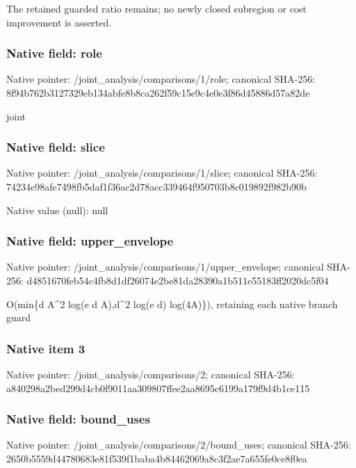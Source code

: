 \documentclass[10pt,a4paper]{article}
\begin{document}
\begingroup\raggedright\sloppy The retained guarded ratio remains;\allowbreak{} no newly closed subregion or cost improvement is asserted.\par\endgroup

\subsubsection{Native field: role}
Native pointer: /joint\_\allowbreak{}analysis/comparisons/1/role; canonical SHA-256: 8f94b762b3127329eb134abfe8b8ca262f59c15e9c4e0e3f86d45886d57a82de

\begingroup\raggedright\sloppy joint\par\endgroup

\subsubsection{Native field: slice}
Native pointer: /joint\_\allowbreak{}analysis/comparisons/1/slice; canonical SHA-256: 74234e98afe7498fb5daf1f36ac2d78acc339464f950703b8c019892f982b90b

Native value (null): null

\subsubsection{Native field: upper\_\allowbreak{}envelope}
Native pointer: /joint\_\allowbreak{}analysis/comparisons/1/upper\_\allowbreak{}envelope; canonical SHA-256: d4851670feb54c4fb8d1df26074e2be81da28390a1b511e55183ff2020dc5f04

\begingroup\raggedright\sloppy O(min\{d A\textasciicircum{}2 log(e d A),\allowbreak{}d\textasciicircum{}2 log(e d) log(4A)\}),\allowbreak{} retaining each native branch guard\par\endgroup

\subsubsection{Native item 3}
Native pointer: /joint\_\allowbreak{}analysis/comparisons/2; canonical SHA-256: a840298a2bed299d4cb0f9011aa309807ffee2aa8695c6199a179f9d4b1ce115

\subsubsection{Native field: bound\_\allowbreak{}uses}
Native pointer: /joint\_\allowbreak{}analysis/comparisons/2/bound\_\allowbreak{}uses; canonical SHA-256: 2650b5559d44780683e81f539f1baba4b84462069a8c3f2ae7a655fe0ce8f0ea
\end{document}

